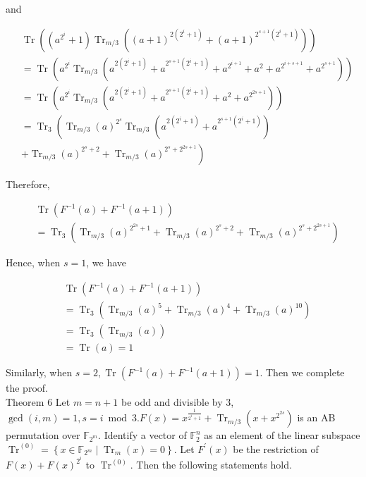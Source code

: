 \documentclass[10pt]{article}
\begin{document}
and

$$
\begin{aligned}
& \operatorname{Tr}\left(\left(a^{2^{i}}+1\right) \operatorname{Tr}_{m / 3}\left((a+1)^{2\left(2^{i}+1\right)}+(a+1)^{2^{s+1}\left(2^{i}+1\right)}\right)\right) \\
&= \operatorname{Tr}\left(a^{2^{i}} \operatorname{Tr}_{m / 3}\left(a^{2\left(2^{i}+1\right)}+a^{2^{s+1}\left(2^{i}+1\right)}+a^{2^{i+1}}+a^{2}+a^{2^{i+s+1}}+a^{2^{s+1}}\right)\right) \\
&= \operatorname{Tr}\left(a^{2^{i}} \operatorname{Tr}_{m / 3}\left(a^{2\left(2^{i}+1\right)}+a^{2^{s+1}\left(2^{i}+1\right)}+a^{2}+a^{2^{2 s+1}}\right)\right) \\
&= \operatorname{Tr}_{3}\left(\operatorname{Tr}_{m / 3}(a)^{2^{s}} \operatorname{Tr}_{m / 3}\left(a^{2\left(2^{i}+1\right)}+a^{2^{s+1}\left(2^{i}+1\right)}\right)\right. \\
&\left.+\operatorname{Tr}_{m / 3}(a)^{2^{s}+2}+\operatorname{Tr}_{m / 3}(a)^{2^{s}+2^{2 s+1}}\right)
\end{aligned}
$$

Therefore,

$$
\begin{aligned}
& \operatorname{Tr}\left(F^{-1}(a)+F^{-1}(a+1)\right) \\
& =\operatorname{Tr}_{3}\left(\operatorname{Tr}_{m / 3}(a)^{2^{2 s}+1}+\operatorname{Tr}_{m / 3}(a)^{2^{s}+2}+\operatorname{Tr}_{m / 3}(a)^{2^{s}+2^{2 s+1}}\right)
\end{aligned}
$$

Hence, when $s=1$, we have

$$
\begin{aligned}
& \operatorname{Tr}\left(F^{-1}(a)+F^{-1}(a+1)\right) \\
& =\operatorname{Tr}_{3}\left(\operatorname{Tr}_{m / 3}(a)^{5}+\operatorname{Tr}_{m / 3}(a)^{4}+\operatorname{Tr}_{m / 3}(a)^{10}\right) \\
& =\operatorname{Tr}_{3}\left(\operatorname{Tr}_{m / 3}(a)\right) \\
& =\operatorname{Tr}(a)=1
\end{aligned}
$$

Similarly, when $s=2, \operatorname{Tr}\left(F^{-1}(a)+F^{-1}(a+1)\right)=1$. Then we complete the proof.\\
Theorem 6 Let $m=n+1$ be odd and divisible by 3, $\operatorname{gcd}(i, m)=1, s=i \bmod 3 . F(x)= x^{\frac{1}{2^{i}+1}}+\operatorname{Tr}_{m / 3}\left(x+x^{2^{2 s}}\right)$ is an AB permutation over $\mathbb{F}_{2^{m}}$. Identify a vector of $\mathbb{F}_{2}^{n}$ as an element of the linear subspace $\operatorname{Tr}^{(0)}=\left\{x \in \mathbb{F}_{2^{m}} \mid \operatorname{Tr}_{m}(x)=0\right\}$. Let $F^{\prime}(x)$ be the restriction of $F(x)+F(x)^{2^{i}}$ to $\operatorname{Tr}^{(0)}$. Then the following statements hold.
\end{document}
